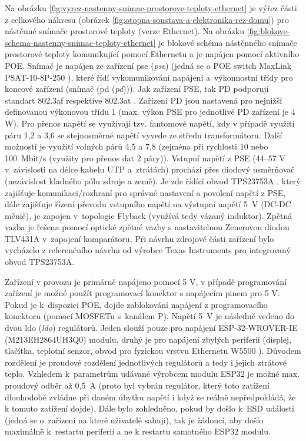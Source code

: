 Na obrázku \ref{fig:vyrez-nastenny-snimac-prostorove-teploty-ethernet} je výřez části z celkového nákresu (obrázek \ref{fig:otopna-soustava-a-elektronika-rez-domu}) pro nástěnné snímače prostorové teploty (verze Ethernet). Na obrázku \ref{fig:blokove-schema-nastenny-snimac-teploty-ethernet} je blokové schéma nástěnného snímače prostorové teploty komunikující pomocí Ethernetu a je napájen pomocí aktivního POE. Snímač je napájen ze zařízení \acrshort{pse} (\textit{\acrlong{pse}}) (jedná se o POE switch MaxLink PSAT-10-8P-250 \cite{maxlink-psat-10-8p-250}), které řídí vykomunikování napájení a~výkonnostní třídy pro koncové zařízení (snímač (\acrshort{pd} (\textit{\acrlong{pd}}))). Jak zařízení PSE, tak PD podporují standart 802.3af \cite{norma-802.3af} respektive 802.3at \cite{norma-802.3at}. Zařízení PD jsou nastavená pro nejnižší definovanou výkonovou třídu 1 (max. výkon PSE pro jednotlivé PD zařízení je 4 W). Pro přenos napětí se využívají tzv. fantomové napětí, kdy v případě využití páru 1,2 a 3,6 se stejnosměrné napětí vyvede ze středu transformátoru. Další možností je využití volných párů 4,5 a 7,8 (zejména při rychlosti 10 nebo 100~Mbit/s (využity pro přenos dat 2 páry)). Vstupní napětí z PSE (44–57 V v~závislosti na délce kabelu UTP a~ztrátách) prochází přes diodový usměrňovač (nezávislost kladného pólu zdroje a země). Je zde řídící obvod TPS23753A \cite{tps23753a}, který zajišťuje komunikaci/rozhraní pro správné nastavení a povolení napětí z PSE, dále zajišťuje řízení převodu vstupního napětí na výstupní napětí 5~V (DC-DC měnič), je zapojen v~topologie Flyback (využívá tedy vázaný induktor). Zpětná vazba je řešena pomocí optické zpětné vazby s nastavitelnou Zenerovou diodou TLV431A \cite{tlv431a} v~zapojení komparátoru. Při návrhu zdrojové části zařízení bylo vycházelo z referenčního návrhu od výrobce Texas Instruments pro integrovaný obvod TPS23753A.

Zařízení v provozu je primárně  napájeno pomocí 5 V, v případě programování zařízení je možné použít programovací konektor s napájecím pinem pro 5 V. Pokud je k~dispozici POE, dojde zablokování napájení z programovacího konektoru (pomocí MOSFETu s~kanálem P). Napětí 5~V je následně vedeno do dvou \acrshort{ldo} (\textit{\acrlong{ldo}}) regulátorů. Jeden slouží pouze pro napájení ESP-32-WROVER-IE (M213EH2864UH3Q0) \cite{esp32-wrover-ie} modulu, druhý je pro napájení zbylých periferií (displej, tlačítka, teplotní senzor, obvod pro fyzickou vrstvu Ethernetu W5500 \cite{w5500}). Důvodem rozdělení je proudové rozdělení jednotlivých regulátorů a tedy i jejich ztrátové teplo. Vzhledem k~parametrům udávané výrobcem modulu ESP32 je možné max. proudový odběr až 0,5~A (proto byl vybrán regulátor, který toto zatížení dlouhodobě zvládne při daném úbytku napětí i když se reálně nepředpokládá, že k tomuto zatížení dojde). Dále bylo zohledněno, pokud by došlo k~ESD události (jedná se o~zařízení na které uživatelé sahají), tak je žádoucí, aby došlo maximálně k~restartu periferií a ne k restartu samotného ESP32 modulu. 


